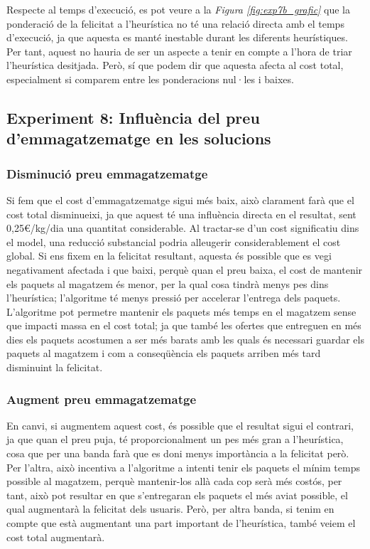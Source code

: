 \documentclass[a4paper]{article}
\begin{document}
\begin{table}[ht]
	Respecte al temps d'execució, es pot veure a la \textit{Figura \ref{fig:exp7b_grafic}} que la ponderació de la felicitat a l'heurística no té una relació directa amb el temps d'execució, ja que aquesta es manté inestable durant les diferents heurístiques. Per tant, aquest no hauria de ser un aspecte a tenir en compte a l'hora de triar l'heurística desitjada. Però, sí que podem dir que aquesta afecta al cost total, especialment si comparem entre les ponderacions nul·les i baixes. \\
	
	
	\subsection{Experiment 8: Influència del preu d'emmagatzematge en les solucions}
	
	\subsubsection{Disminució preu emmagatzematge}
	
	Si fem que el cost d'emmagatzematge sigui més baix, això clarament farà que el cost total disminueixi, ja que aquest té una influència directa en el resultat, sent 0,25€/kg/dia una quantitat considerable. Al tractar-se d'un cost significatiu dins el model, una reducció substancial podria alleugerir considerablement el cost global. Si ens fixem en la felicitat resultant, aquesta és possible que es vegi negativament afectada i que baixi, perquè quan el preu baixa, el cost de mantenir els paquets al magatzem és menor, per la qual cosa tindrà menys pes dins l'heurística; l'algoritme té menys pressió per accelerar l'entrega dels paquets. L'algoritme pot permetre mantenir els paquets més temps en el magatzem sense que impacti massa en el cost total; ja que també les ofertes que entreguen en més dies els paquets acostumen a ser més barats amb les quals és necessari guardar els paquets al magatzem i com a conseqüència els paquets arriben més tard disminuint la felicitat.\\
	
	\subsubsection{Augment preu emmagatzematge}

	En canvi, si augmentem aquest cost, és possible que el resultat sigui el contrari, ja que quan el preu puja, té proporcionalment un pes més gran a l'heurística, cosa que per una banda farà que es doni menys importància a la felicitat però. Per l'altra, això incentiva a l'algoritme a intenti tenir els paquets el mínim temps possible al magatzem, perquè mantenir-los allà cada cop serà més costós, per tant, això pot resultar en que s'entregaran els paquets el més aviat possible, el qual augmentarà la felicitat dels usuaris. Però, per altra banda, si tenim en compte que està augmentant una part important de l'heurística, també veiem el cost total augmentarà.\\



\end{table}
\end{document}
